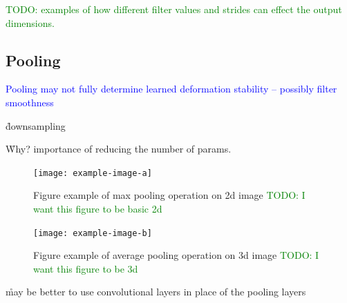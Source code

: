 \textcolor{green}{TODO: examples of how different filter values and strides can effect the output dimensions.}




\subsection{Pooling}


\textcolor{blue}{Pooling may not fully determine learned deformation stability -- possibly filter smoothness\cite{ruderman2018learned}}

\r{downsampling}

\r{Why? importance of reducing the number of params.}




\begin{figure}[htp]
	\centering
	\texttt{[image: example-image-a]}\hfil
	\caption{Figure example of max pooling operation on 2d image \textcolor{green}{TODO: I want this figure to be basic 2d}}
	\label{fig:pooling_max_2d_ex_a}
\end{figure}

\begin{figure}[htp]
	\centering
	\texttt{[image: example-image-b]}\hfil
	\caption{Figure example of average pooling operation on 3d image \textcolor{green}{TODO: I want this figure to be 3d}}
	\label{fig:pooling_avg_3d_ex_a}
\end{figure}


\r{may be better to use convolutional layers in place of the pooling layers\cite{springenberg2014striving}}